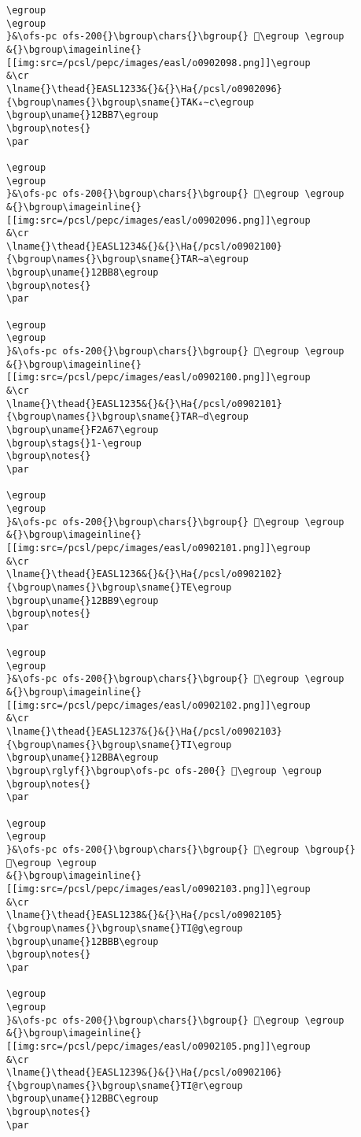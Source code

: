 \begin{verbatim}
\egroup
\egroup
}&\ofs-pc ofs-200{}\bgroup\chars{}\bgroup{} 𒮵\egroup \egroup
&{}\bgroup\imageinline{}[[img:src=/pcsl/pepc/images/easl/o0902098.png]]\egroup
&\cr
\lname{}\thead{}EASL1233&{}&{}\Ha{/pcsl/o0902096}{\bgroup\names{}\bgroup\sname{}TAK₄∼c\egroup
\bgroup\uname{}12BB7\egroup
\bgroup\notes{}
\par 

\egroup
\egroup
}&\ofs-pc ofs-200{}\bgroup\chars{}\bgroup{} 𒮷\egroup \egroup
&{}\bgroup\imageinline{}[[img:src=/pcsl/pepc/images/easl/o0902096.png]]\egroup
&\cr
\lname{}\thead{}EASL1234&{}&{}\Ha{/pcsl/o0902100}{\bgroup\names{}\bgroup\sname{}TAR∼a\egroup
\bgroup\uname{}12BB8\egroup
\bgroup\notes{}
\par 

\egroup
\egroup
}&\ofs-pc ofs-200{}\bgroup\chars{}\bgroup{} 𒮸\egroup \egroup
&{}\bgroup\imageinline{}[[img:src=/pcsl/pepc/images/easl/o0902100.png]]\egroup
&\cr
\lname{}\thead{}EASL1235&{}&{}\Ha{/pcsl/o0902101}{\bgroup\names{}\bgroup\sname{}TAR∼d\egroup
\bgroup\uname{}F2A67\egroup
\bgroup\stags{}1-\egroup
\bgroup\notes{}
\par 

\egroup
\egroup
}&\ofs-pc ofs-200{}\bgroup\chars{}\bgroup{} 󲩧\egroup \egroup
&{}\bgroup\imageinline{}[[img:src=/pcsl/pepc/images/easl/o0902101.png]]\egroup
&\cr
\lname{}\thead{}EASL1236&{}&{}\Ha{/pcsl/o0902102}{\bgroup\names{}\bgroup\sname{}TE\egroup
\bgroup\uname{}12BB9\egroup
\bgroup\notes{}
\par 

\egroup
\egroup
}&\ofs-pc ofs-200{}\bgroup\chars{}\bgroup{} 𒮹\egroup \egroup
&{}\bgroup\imageinline{}[[img:src=/pcsl/pepc/images/easl/o0902102.png]]\egroup
&\cr
\lname{}\thead{}EASL1237&{}&{}\Ha{/pcsl/o0902103}{\bgroup\names{}\bgroup\sname{}TI\egroup
\bgroup\uname{}12BBA\egroup
\bgroup\rglyf{}\bgroup\ofs-pc ofs-200{} 𒮺\egroup \egroup
\bgroup\notes{}
\par 

\egroup
\egroup
}&\ofs-pc ofs-200{}\bgroup\chars{}\bgroup{} 𒮺\egroup \bgroup{} 𒮾\egroup \egroup
&{}\bgroup\imageinline{}[[img:src=/pcsl/pepc/images/easl/o0902103.png]]\egroup
&\cr
\lname{}\thead{}EASL1238&{}&{}\Ha{/pcsl/o0902105}{\bgroup\names{}\bgroup\sname{}TI@g\egroup
\bgroup\uname{}12BBB\egroup
\bgroup\notes{}
\par 

\egroup
\egroup
}&\ofs-pc ofs-200{}\bgroup\chars{}\bgroup{} 𒮻\egroup \egroup
&{}\bgroup\imageinline{}[[img:src=/pcsl/pepc/images/easl/o0902105.png]]\egroup
&\cr
\lname{}\thead{}EASL1239&{}&{}\Ha{/pcsl/o0902106}{\bgroup\names{}\bgroup\sname{}TI@r\egroup
\bgroup\uname{}12BBC\egroup
\bgroup\notes{}
\par 


\end{verbatim}
